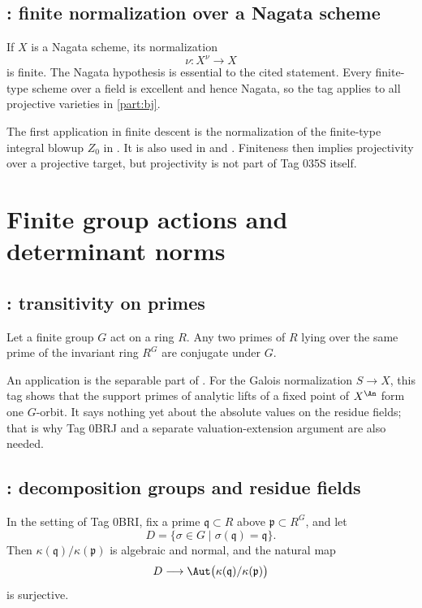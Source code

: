 \subsection*{: finite normalization over a Nagata scheme}
\label{sec:stacks-tag-035S}

If \(X\) is a Nagata scheme, its normalization
\[
                         \nu:X^\nu\longrightarrow X
\]
is finite. The Nagata hypothesis is essential to the cited statement.
Every finite-type scheme over a field is excellent and hence Nagata, so the
tag applies to all projective varieties in \cref{part:bj}.

The first application in finite descent is the normalization of the
finite-type integral blowup \(Z_0\) in
. It is also used in
 and
. Finiteness then
implies projectivity over a projective target, but projectivity is not part
of Tag 035S itself.

\section{Finite group actions and determinant norms}
\label{sec:stacks-finite}

\subsection*{: transitivity on primes}
\label{sec:stacks-tag-0BRI}

Let a finite group \(G\) act on a ring \(R\). Any two primes of \(R\)
lying over the same prime of the invariant ring \(R^G\) are conjugate under
\(G\).

An application is the separable part of
. For the Galois normalization
\(S\to X\), this tag shows that the support primes of analytic lifts of a
fixed point of \(X^{\An}\) form one \(G\)-orbit. It says nothing yet about
the absolute values on the residue fields; that is why Tag 0BRJ and a
separate valuation-extension argument are also needed.

\subsection*{: decomposition groups and residue fields}
\label{sec:stacks-tag-0BRJ}

In the setting of Tag 0BRI, fix a prime \(\mathfrak q\subset R\) above
\(\mathfrak p\subset R^G\), and let
\[
                     D=\{\sigma\in G\mid\sigma(\mathfrak q)=\mathfrak q\}.
\]
Then \(\kappa(\mathfrak q)/\kappa(\mathfrak p)\) is algebraic and normal,
and the natural map
\[
       D\longrightarrow
       \Aut\bigl(\kappa(\mathfrak q)/\kappa(\mathfrak p)\bigr)
\]
is surjective.

